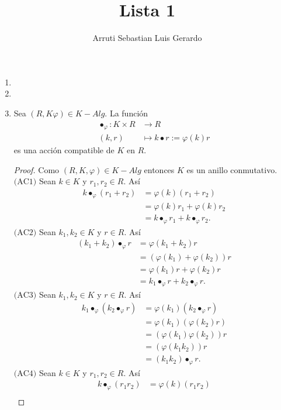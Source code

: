 \documentclass{article}
\title{Lista 1}
\author{Arruti Sebastian Luis Gerardo}
\date{}
\newcommand{\lrprth}[1]{
    \left(#1\right)
}
\newcommand{\descapp}[6]{
    #1: #2 &\rightarrow #3\\
    #4 &\mapsto #5#6 
}
\theoremstyle{definition}
\theoremstyle{plain}
\theoremstyle{plain}
\theoremstyle{definition}
\theoremstyle{definition}
\theoremstyle{definition}
\theoremstyle{definition}
\theoremstyle{definition}
\theoremstyle{definition}
\begin{document}
\maketitle
\begin{enumerate}
\item
    \item
    \item Sea $\lrprth{R,K\varphi}\in K-Alg$. La función 
    \begin{align*}
        \descapp{\bullet_\varphi}{K\times R}{R}{(k,r)}{k\bullet r:=\varphi\lrprth{k}r}{}
    \end{align*}
    es una acción compatible de $K$ en $R$.
    \begin{proof}
    Como $\lrprth{R,K,\varphi}\in K-Alg$ entonces $K$ es un anillo conmutativo.\\
    $\boxed{\text{(AC1)}}$ Sean $k\in K$ y $r_1,r_2\in R$. Así
    \begin{align*}
        k\bullet_\varphi\lrprth{r_1+r_2}&=\varphi\lrprth{k}\lrprth{r_1+r_2}\\
        &=\varphi\lrprth{k}r_1+\varphi\lrprth{k}r_2\\
        &=k\bullet_\varphi r_1+k\bullet_\varphi r_2.
    \end{align*}
    $\boxed{\text{(AC2)}}$ Sean $k_1,k_2\in K$ y $r\in R$. Así
    \begin{align*}
        \lrprth{k_1+k_2}\bullet_\varphi r&=\varphi\lrprth{k_1+k_2}r\\
        &=\lrprth{\varphi(k_1)+\varphi(k_2)}r\\
        &=\varphi(k_1)r+\varphi(k_2)r\\
        &=k_1\bullet_\varphi r+k_2\bullet_\varphi r.
    \end{align*}
    $\boxed{\text{(AC3)}}$ Sean $k_1,k_2\in K$ y $r\in R$. Así
    \begin{align*}
        k_1\bullet_\varphi\lrprth{k_2\bullet_\varphi r}&=\varphi\lrprth{k_1}\lrprth{k_2\bullet_\varphi r}\\
        &=\varphi\lrprth{k_1}\lrprth{\varphi\lrprth{k_2}r}\\
        &=\lrprth{\varphi\lrprth{k_1}\varphi\lrprth{k_2}}r\\
        &=\lrprth{\varphi\lrprth{k_1k_2}}r\\
        &=\lrprth{k_1k_2}\bullet_\varphi r.
    \end{align*}
     $\boxed{\text{(AC4)}}$ Sean $k\in K$ y $r_1,r_2\in R$. Así
    \begin{align*}
        k\bullet_\varphi\lrprth{r_1r_2}&=\varphi(k)\lrprth{r_1r_2}\\

\end{align*}
\end{proof}
\end{enumerate}
\end{document}
